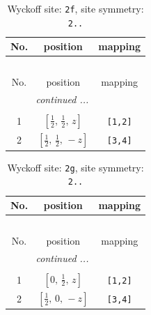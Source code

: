 \documentclass[fleqn,8pt]{jsarticle}
\begin{document}
\renewcommand{\arraystretch}{1.2}
\begin{longtable}{ccc}
\caption{Wyckoff site: {\tt 2f}, site symmetry: {\tt 2..}}
 \\
 \hline \hline
No. & position & mapping \\ \hline \endfirsthead

\multicolumn{2}{l}{\tablename\ \thetable{}} \\
 \hline \hline
No. & position & mapping \\ \hline \endhead

 \hline \hline
\multicolumn{2}{r}{\footnotesize\it continued ...} \\ \endfoot

 \hline \hline
\multicolumn{2}{r}{} \\ \endlastfoot

1 & $\left[ \frac{1}{2},\, \frac{1}{2},\, z \right]$ & {\tt [1,2]} \\ \hline
2 & $\left[ \frac{1}{2},\, \frac{1}{2},\, - z \right]$ & {\tt [3,4]} \\
\end{longtable}
\renewcommand{\arraystretch}{1.2}
\begin{longtable}{ccc}
\caption{Wyckoff site: {\tt 2g}, site symmetry: {\tt 2..}}
 \\
 \hline \hline
No. & position & mapping \\ \hline \endfirsthead

\multicolumn{2}{l}{\tablename\ \thetable{}} \\
 \hline \hline
No. & position & mapping \\ \hline \endhead

 \hline \hline
\multicolumn{2}{r}{\footnotesize\it continued ...} \\ \endfoot

 \hline \hline
\multicolumn{2}{r}{} \\ \endlastfoot

1 & $\left[ 0,\, \frac{1}{2},\, z \right]$ & {\tt [1,2]} \\ \hline
2 & $\left[ \frac{1}{2},\, 0,\, - z \right]$ & {\tt [3,4]} \\
\end{longtable}
\renewcommand{\arraystretch}{1.2}
\end{document}
